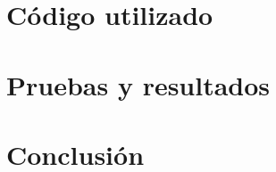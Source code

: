 \documentclass[12pt,letterpaper]{report}
\begin{document}
  \section*{Código utilizado}
  
  \section*{Pruebas y resultados}
  \section*{Conclusión}
\end{document}
